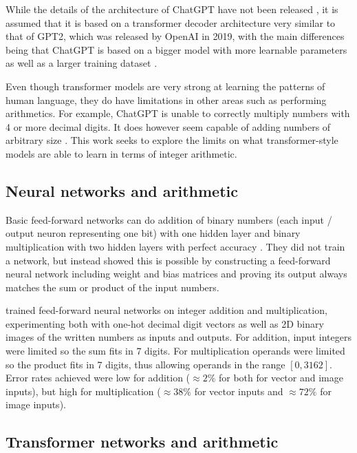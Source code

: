 While the details of the architecture of ChatGPT have not been released \cite{openai_chatgpt_2022} \cite{openai2023gpt4}, it is assumed that it is based on a transformer decoder architecture very similar to that of GPT2, which was released by OpenAI in 2019, with the main differences being that ChatGPT is based on a bigger model with more learnable parameters as well as a larger training dataset \cite{OpenGenus2023GPTComparison}.

Even though transformer models are very strong at learning the patterns of human language, they do have limitations in other areas such as performing arithmetics.
For example, ChatGPT is unable to correctly multiply numbers with 4 or more decimal digits. It does however seem capable of adding numbers of arbitrary size \cite{openai2023gpt4} .  This work seeks to explore the limits on what transformer-style models are able to learn in terms of integer arithmetic.

\subsection{Neural networks and arithmetic}

 Basic feed-forward networks can do addition of binary numbers (each input / output neuron representing one bit) with one hidden layer and binary multiplication with two hidden layers with perfect accuracy \cite{solving}. They did not train a network, but instead showed this is possible by constructing a feed-forward neural network including weight and bias matrices and proving its output always matches the sum or product of the input numbers.

\cite{visual} trained feed-forward neural networks on integer addition and multiplication, experimenting both with one-hot decimal digit vectors as well as 2D binary images of the written numbers as inputs and outputs. For addition, input integers were limited so the sum fits in 7 digits. For multiplication operands were limited so the product fits in 7 digits, thus allowing operands in the range $[0, 3162]$. Error rates achieved were low for addition ($\approx 2\%$ for both for vector and image inputs), but high for multiplication ($\approx 38\%$ for vector inputs and $\approx 72\%$ for image inputs).

\subsection{Transformer networks and arithmetic}

